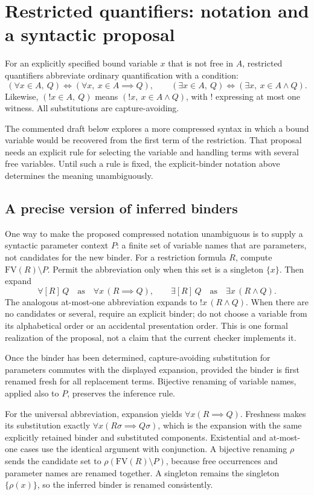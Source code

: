 \def\topic{}

\section{Restricted quantifiers: notation and a syntactic proposal}
For an explicitly specified bound variable $x$ that is not free in $A$,
restricted quantifiers abbreviate ordinary quantification with a condition:
\[
(\forall x\in A,\ Q)\iff(\forall x,\ x\in A\implies Q),
\qquad
(\exists x\in A,\ Q)\iff(\exists x,\ x\in A\land Q).
\]
Likewise, $(!x\in A,\ Q)$ means $(!x,\ x\in A\land Q)$, with $!$
expressing at most one witness. All substitutions are capture-avoiding.

The commented draft below explores a more compressed syntax in which a
bound variable would be recovered from the first term of the restriction.
That proposal needs an explicit rule for selecting the variable and
handling terms with several free variables. Until such a rule is fixed,
the explicit-binder notation above determines the meaning unambiguously.
\subsection{A precise version of inferred binders}
One way to make the proposed compressed notation unambiguous is to
supply a syntactic parameter context $P$: a finite set of variable names
that are parameters, not candidates for the new binder. For a restriction
formula $R$, compute $\mathrm{FV}(R)\setminus P$. Permit the abbreviation
only when this set is a singleton $\{x\}$. Then expand
\[
\forall[R]\,Q\quad\text{as}\quad\forall x\,(R\implies Q),
\qquad
\exists[R]\,Q\quad\text{as}\quad\exists x\,(R\land Q).
\]
The analogous at-most-one abbreviation expands to $!x\,(R\land Q)$.
When there are no candidates or several, require an explicit binder;
do not choose a variable from its alphabetical order or an accidental
presentation order. This is one formal realization of the proposal,
not a claim that the current checker implements it.

\begin{proposition}
Once the binder has been determined, capture-avoiding substitution for
parameters commutes with the displayed expansion, provided the binder
is first renamed fresh for all replacement terms. Bijective renaming
of variable names, applied also to $P$, preserves the inference rule.
\end{proposition}
\Proof
For the universal abbreviation, expansion yields $\forall x(R\implies Q)$.
Freshness makes its substitution exactly
$\forall x(R\sigma\implies Q\sigma)$, which is the expansion with the
same explicitly retained binder and substituted components. Existential
and at-most-one cases use the identical argument with conjunction.
A bijective renaming $\rho$ sends the candidate set to
$\rho(\mathrm{FV}(R)\setminus P)$, because free occurrences and parameter
names are renamed together. A singleton remains the singleton
$\{\rho(x)\}$, so the inferred binder is renamed consistently.
\Done

